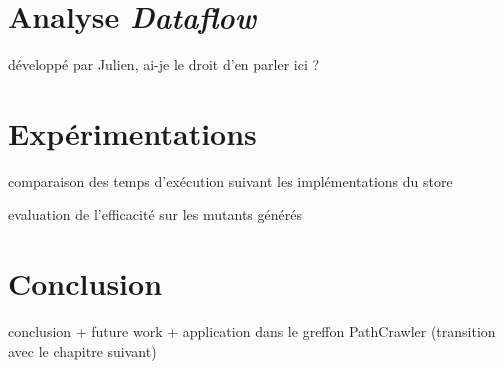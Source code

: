 \section{Analyse {\em Dataflow}}
{\color{red}développé par Julien, ai-je le droit d'en parler ici ?}


\section{Expérimentations}
comparaison des temps d'exécution suivant les implémentations du store

evaluation de l'efficacité sur les mutants générés

\section{Conclusion}
conclusion + future work + application dans le greffon PathCrawler (transition
avec le chapitre suivant)
